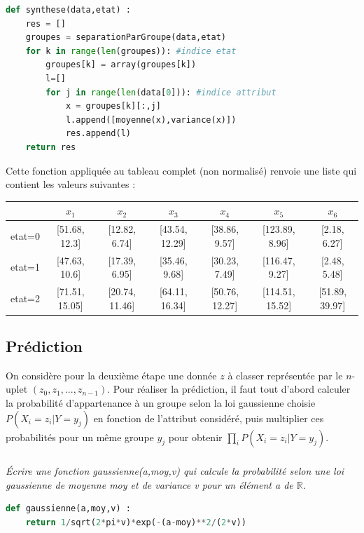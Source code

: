 \ifprof
\begin{corrige}
\begin{lstlisting}[language=Python]
def synthese(data,etat) :
    res = []
    groupes = separationParGroupe(data,etat)
    for k in range(len(groupes)): #indice etat
        groupes[k] = array(groupes[k])
        l=[]
        for j in range(len(data[0])): #indice attribut
            x = groupes[k][:,j]
            l.append([moyenne(x),variance(x)])
            res.append(l)
    return res
\end{lstlisting}
\end{corrige}
\else
\fi
\ifprof
\else
Cette fonction appliquée au tableau  complet (non normalisé) renvoie une liste qui contient les
valeurs suivantes :

\footnotesize

\begin{center}
\begin{tabular}{|c||c|c|c|c|c|c|}
\hline
 & $x_1$ & $x_2$ & $x_3$ & $x_4$ & $x_5$ & $x_6$ \\ \hline
etat=0 &[51.68, 12.3] &[12.82, 6.74] &[43.54, 12.29] &[38.86, 9.57] &[123.89, 8.96] &[2.18, 6.27] \\ \hline
etat=1 &[47.63, 10.6] &[17.39, 6.95] &[35.46, 9.68] &[30.23, 7.49]& [116.47, 9.27] &[2.48, 5.48] \\ \hline
etat=2 &[71.51, 15.05] &[20.74, 11.46] &[64.11, 16.34] &[50.76, 12.27] &[114.51, 15.52] &[51.89, 39.97] \\ \hline
\end{tabular}
\end{center}
\normalsize
\fi

\subsection*{Prédiction}
\ifprof
\else
On considère pour la deuxième étape une donnée $z$ à classer représentée par le $n$-uplet $\left(z_0, z_1, ..., z_{n-1}\right)$.
Pour réaliser la prédiction, il faut tout d’abord calculer la probabilité d’appartenance à un groupe
selon la loi gaussienne choisie $P\left(X_i = z_i|Y = y_j\right)$ en fonction de l’attribut considéré, puis multiplier ces probabilités pour un même groupe $y_j$ pour obtenir
$\prod\limits_{i}P\left(X_i = z_i|Y = y_j\right)$.

\fi

\subparagraph{}\textit{Écrire une fonction gaussienne(a,moy,v) qui calcule la probabilité selon une loi gaussienne
de moyenne moy et de variance v pour un élément a de $\mathbb{R}$.}
\ifprof
\begin{corrige}
\begin{lstlisting}[language=Python]
def gaussienne(a,moy,v) :
    return 1/sqrt(2*pi*v)*exp(-(a-moy)**2/(2*v))
\end{lstlisting}
\end{corrige}
\else
\fi



